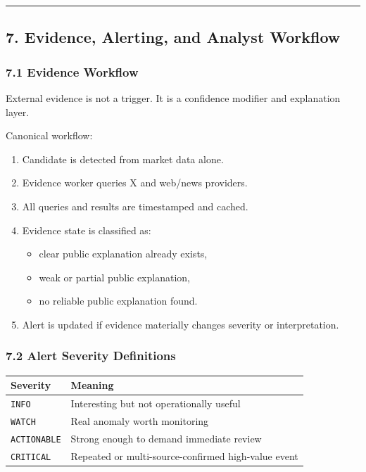 \documentclass[
]{article}
\newcounter{none} %
\providecommand{\tightlist}{%
  \setlength{\itemsep}{0pt}\setlength{\parskip}{0pt}}
\begin{document}
\begin{center}\rule{0.5\linewidth}{0.5pt}\end{center}

\subsection{7. Evidence, Alerting, and Analyst
Workflow}\label{7-evidence-alerting-and-analyst-workflow}

\subsubsection{7.1 Evidence Workflow}\label{71-evidence-workflow}

External evidence is not a trigger. It is a confidence modifier and
explanation layer.

Canonical workflow:

\begin{enumerate}
\def\labelenumi{\arabic{enumi}.}
\tightlist
\item
  Candidate is detected from market data alone.
\item
  Evidence worker queries X and web/news providers.
\item
  All queries and results are timestamped and cached.
\item
  Evidence state is classified as:

  \begin{itemize}
  \tightlist
  \item
    clear public explanation already exists,
  \item
    weak or partial public explanation,
  \item
    no reliable public explanation found.
  \end{itemize}
\item
  Alert is updated if evidence materially changes severity or
  interpretation.
\end{enumerate}

\subsubsection{7.2 Alert Severity
Definitions}\label{72-alert-severity-definitions}

{\def\LTcaptype{none} %
\begin{longtable}[]{@{}ll@{}}
\toprule\noalign{}
Severity & Meaning \\
\midrule\noalign{}
\endhead
\bottomrule\noalign{}
\endlastfoot
\texttt{INFO} & Interesting but not operationally useful \\
\texttt{WATCH} & Real anomaly worth monitoring \\
\texttt{ACTIONABLE} & Strong enough to demand immediate review \\
\texttt{CRITICAL} & Repeated or multi-source-confirmed high-value
event \\
\end{longtable}
}
\end{document}
